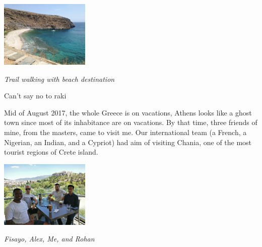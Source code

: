 \documentclass[10pt,a4paper]{article} %
\newcommand{\NewsItem}[1]{ %
\usefont{T1}{fvs}{n}{n} %
\vspace{24pt}\large #1\vspace{3pt} %
\par \normalsize \normalfont}
\begin{document}
\begin{multicols}{3}
\begin{center}
	\includegraphics[width=0.32\textwidth]{media/isolated_beach.jpg}
	\par\textit{Trail walking with beach destination}
\end{center}


\NewsItem{Can't say no to raki}

Mid of August 2017, the whole Greece is on vacations, Athens looks like a ghost 
town since most of its inhabitance are on vacations. 
By that time, three friends of mine, from the masters, came to visit me. 
Our international team (a French, a Nigerian, an Indian, and a Cypriot) had aim 
of visiting Chania, one of the most tourist regions of Crete island.   
 

\begin{center}
	\includegraphics[width=0.32\textwidth]{media/chania_1.jpg}
	\par\textit{Fisayo, Alex, Me, and Rohan}
\end{center}



\end{multicols}
\end{document}
